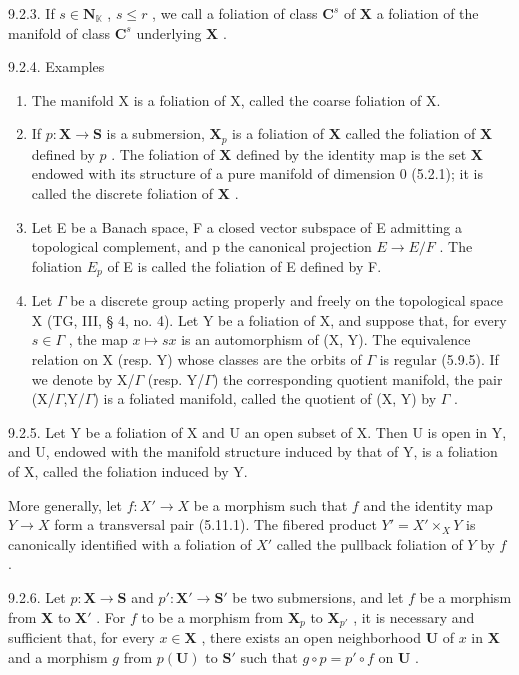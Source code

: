 9.2.3. If \(s \in \mathbf{N}_{\mathbb{K}}\) , \(s \leqslant r\) , we call a foliation of class \(\mathbf{C}^s\) of \(\mathbf{X}\) a foliation of the manifold of class \(\mathbf{C}^s\) underlying \(\mathbf{X}\) .

9.2.4. Examples

\begin{enumerate}
\def\labelenumi{\alph{enumi})}
\item
  The manifold X is a foliation of X, called the coarse foliation of X.
\item
  If \(p: \mathbf{X} \to \mathbf{S}\) is a submersion, \(\mathbf{X}_p\) is a foliation of \(\mathbf{X}\) called the foliation of \(\mathbf{X}\) defined by \(p\) . The foliation of \(\mathbf{X}\) defined by the identity map is the set \(\mathbf{X}\) endowed with its structure of a pure manifold of dimension 0 (5.2.1); it is called the discrete foliation of \(\mathbf{X}\) .
\item
  Let E be a Banach space, F a closed vector subspace of E admitting a topological complement, and p the canonical projection \(E \rightarrow E/F\) . The foliation \(E_{p}\) of E is called the foliation of E defined by F.
\item
  Let \(\Gamma\) be a discrete group acting properly and freely on the topological space X (TG, III, § 4, no. 4). Let Y be a foliation of X, and suppose that, for every \(s \in \Gamma\) , the map \(x \mapsto sx\) is an automorphism of (X, Y). The equivalence relation on X (resp. Y) whose classes are the orbits of \(\Gamma\) is regular (5.9.5). If we denote by X/\(\Gamma\) (resp. Y/\(\Gamma\)) the corresponding quotient manifold, the pair (X/\(\Gamma\),Y/\(\Gamma\)) is a foliated manifold, called the quotient of (X, Y) by \(\Gamma\) .
\end{enumerate}

9.2.5. Let Y be a foliation of X and U an open subset of X. Then U is open in Y, and U, endowed with the manifold structure induced by that of Y, is a foliation of X, called the foliation induced by Y.

More generally, let \(f: X' \to X\) be a morphism such that \(f\) and the identity map \(Y \to X\) form a transversal pair (5.11.1). The fibered product \(Y' = X' \times_X Y\) is canonically identified with a foliation of \(X'\) called the pullback foliation of \(Y\) by \(f\) .

9.2.6. Let \(p: \mathbf{X} \to \mathbf{S}\) and \(p': \mathbf{X}' \to \mathbf{S}'\) be two submersions, and let \(f\) be a morphism from \(\mathbf{X}\) to \(\mathbf{X}'\) . For \(f\) to be a morphism from \(\mathbf{X}_p\) to \(\mathbf{X}_{p'}\) , it is necessary and sufficient that, for every \(x \in \mathbf{X}\) , there exists an open neighborhood \(\mathbf{U}\) of \(x\) in \(\mathbf{X}\) and a morphism \(g\) from \(p(\mathbf{U})\) to \(\mathbf{S}'\) such that \(g \circ p = p' \circ f\) on \(\mathbf{U}\) .

